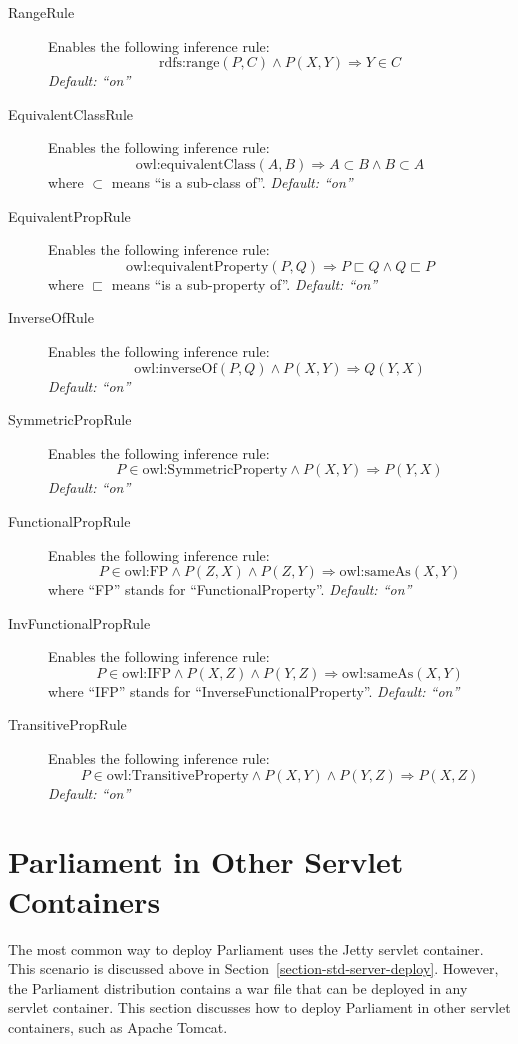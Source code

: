 \begin{description}
	\item[RangeRule] Enables the following inference rule:
\[\text{rdfs:range}(P,C) \land P(X, Y) \Rightarrow Y \in C\]
\emph{Default: ``on''}

	\item[EquivalentClassRule] Enables the following inference rule:
\[\text{owl:equivalentClass}(A,B) \Rightarrow A \subset B \land B \subset A\]
where $\subset$ means ``is a sub-class of''. \emph{Default: ``on''}

	\item[EquivalentPropRule] Enables the following inference rule:
\[\text{owl:equivalentProperty}(P,Q) \Rightarrow P \sqsubset Q \land Q \sqsubset P\]
where $\sqsubset$ means ``is a sub-property of''. \emph{Default: ``on''}

	\item[InverseOfRule] Enables the following inference rule:
\[\text{owl:inverseOf}(P, Q) \land P(X, Y) \Rightarrow Q(Y, X)\]
\emph{Default: ``on''}

	\item[SymmetricPropRule] Enables the following inference rule:
\[P \in \text{owl:SymmetricProperty} \land P(X, Y) \Rightarrow P(Y, X)\]
\emph{Default: ``on''}

	\item[FunctionalPropRule] Enables the following inference rule:
\[P \in \text{owl:FP} \land P(Z, X) \land P(Z, Y) \Rightarrow \text{owl:sameAs}(X, Y)\]
where ``FP'' stands for ``FunctionalProperty''. \emph{Default: ``on''}

	\item[InvFunctionalPropRule] Enables the following inference rule:
\[P \in \text{owl:IFP} \land P(X, Z) \land P(Y, Z) \Rightarrow \text{owl:sameAs}(X, Y)\]
where ``IFP'' stands for ``InverseFunctionalProperty''. \emph{Default: ``on''}

	\item[TransitivePropRule] Enables the following inference rule:
\[P \in \text{owl:TransitiveProperty} \land P(X, Y) \land P(Y, Z) \Rightarrow P(X, Z)\]
\emph{Default: ``on''}
\end{description}

\section{Parliament in Other Servlet Containers}
\label{section-parliament-with-jena-and-tomcat}

The most common way to deploy Parliament uses the Jetty servlet container.  This scenario is discussed above in Section~\ref{section-std-server-deploy}.  However, the Parliament distribution contains a war file that can be deployed in any servlet container.  This section discusses how to deploy Parliament in other servlet containers, such as Apache Tomcat.

